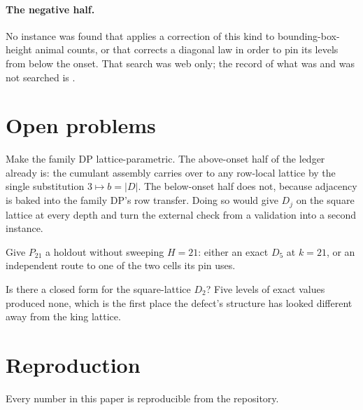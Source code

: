 \documentclass[11pt]{article}
\newcommand{\Dj}{D_j}
\begin{document}
\paragraph{The negative half.} No instance was found that applies a correction
of this kind to bounding-box-height animal counts, or that corrects a diagonal
law in order to pin its levels from below the onset. That search was web only;
the record of what was and was not searched is
.

\section{Open problems}\label{sec:open}

\begin{openproblem}
Make the family DP lattice-parametric. The above-onset half of the ledger
already is: the cumulant assembly carries over to any row-local lattice by the
single substitution $3 \mapsto b = |D|$. The below-onset half does not, because
adjacency is baked into the family DP's row transfer. Doing so would give
$\Dj$ on the square lattice at every depth and turn the external check from a
validation into a second instance.
\end{openproblem}

\begin{openproblem}
Give $P_{21}$ a holdout without sweeping $H = 21$: either an exact $D_5$ at
$k = 21$, or an independent route to one of the two cells its pin uses.
\end{openproblem}

\begin{openproblem}
Is there a closed form for the square-lattice $D_2$? Five levels of exact values
produced none, which is the first place the defect's structure has looked
different away from the king lattice.
\end{openproblem}

\section{Reproduction}\label{sec:repro}

Every number in this paper is reproducible from the repository.
\end{document}
